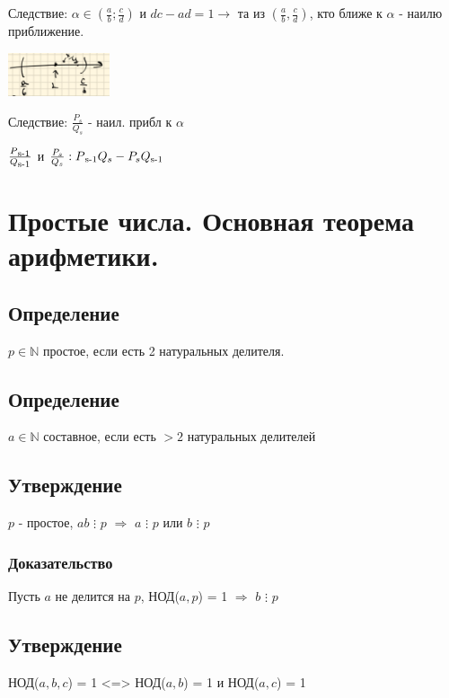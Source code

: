 \documentclass[12pt]{article}
\begin{document}
            Следствие: $\alpha \in (\frac{a}{b};\frac{c}{d})$ и $dc - ad = 1 \rightarrow$ та из $(\frac{a}{b}, \frac{c}{d})$, кто ближе к $\alpha$ - наилю приближение.

            \includegraphics[width=30mm]{image3.png}

            Следствие: $\frac{P_s}{Q_s} $ - наил. прибл к $\alpha$

$\frac{P\textsubscript{s-1}}{Q\textsubscript{s-1}}$ и $\frac{P_s}{Q_s} : P\textsubscript{s-1} Q_s - P_s Q\textsubscript{s-1}$

            \section{Простые числа. Основная теорема арифметики.}
            \subsection{Определение}
        $p \in \mathbb{N}$ простое, если есть 2 натуральных делителя.
            \subsection{Определение}
        $a \in \mathbb{N}$ составное, если есть $>2$ натуральных делителей
            \subsection{Утверждение}
        $p$ - простое, $ab$ $\vdots$ $p$ $\Rightarrow$ $a$ $\vdots$ $p$ или $b$ $\vdots$ $p$
            \subsubsection{Доказательство}
            Пусть $a$ не делится на $p$, НОД($a, p$) = 1 $\Rightarrow$ $b$ $\vdots$ $p$
            \subsection{Утверждение}
            НОД($a, b, c$) = 1 <=> НОД($a, b$) = 1  и НОД($a, c$) = 1
\end{document}
